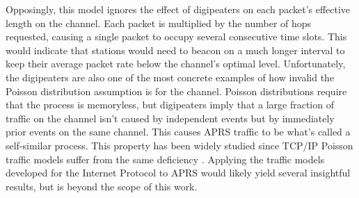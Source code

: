 Opposingly, this model ignores the effect of digipeaters on each packet's
effective length on the channel. Each packet is multiplied by the number of
hops requested, causing a single packet to occupy several consecutive time slots.
This would indicate that stations would need to beacon on a much longer interval
to keep their average packet rate below the channel's optimal level.
Unfortunately, the digipeaters are also one of the most concrete examples of how
invalid the Poisson distribution assumption is for the channel. 
Poisson distributions require that the process is memoryless, but digipeaters
imply that a large fraction of traffic on the channel isn't caused by independent events
but by immediately prior events on the same channel. This causes APRS traffic to
be what's called a self-similar process. This property has been widely studied 
since TCP/IP Poisson traffic models suffer from the same deficiency \cite{failureofpoisson}. 
Applying the traffic models developed for the Internet Protocol to APRS 
would likely yield several insightful results, but is beyond the scope of this work.


